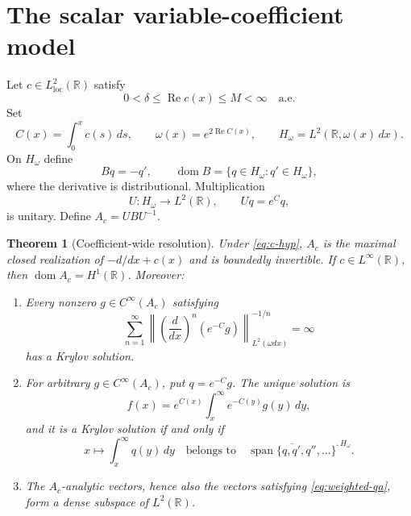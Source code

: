 \documentclass[11pt]{article}
\newtheorem{theorem}{Theorem}
\newcommand{\R}{\mathbb{R}}
\begin{document}
\section*{The scalar variable-coefficient model}

Let $c\in L^2_{\mathrm{loc}}(\R)$ satisfy
\begin{equation}\label{eq:c-hyp}
 0<\delta\leq\operatorname{Re}c(x)\leq M<\infty\quad\text{a.e.}
\end{equation}
Set
\[
 C(x)=\int_0^x c(s)\,ds,\qquad
 \omega(x)=e^{2\operatorname{Re}C(x)},\qquad
 H_\omega=L^2(\R,\omega(x)\,dx).
\]
On $H_\omega$ define
\[
 Bq=-q',\qquad
 \operatorname{dom}B=\{q\in H_\omega:q'\in H_\omega\},
\]
where the derivative is distributional.  Multiplication
\[
 U:H_\omega\to L^2(\R),\qquad Uq=e^Cq,
\]
is unitary.  Define $A_c=UBU^{-1}$.

\begin{theorem}[Coefficient-wide resolution]\label{thm:coefficient}
Under \eqref{eq:c-hyp}, $A_c$ is the maximal closed realization of
$-d/dx+c(x)$ and is boundedly invertible.  If $c\in L^\infty(\R)$, then
$\operatorname{dom}A_c=H^1(\R)$.  Moreover:
\begin{enumerate}[label=\textup{(\roman*)}]
\item Every nonzero $g\in C^\infty(A_c)$ satisfying
\begin{equation}\label{eq:weighted-qa}
 \sum_{n=1}^\infty
 \left\|\left(\frac d{dx}\right)^n(e^{-C}g)
 \right\|_{L^2(\omega dx)}^{-1/n}=\infty
\end{equation}
has a Krylov solution.
\item For arbitrary $g\in C^\infty(A_c)$, put $q=e^{-C}g$.  The unique
solution is
\begin{equation}\label{eq:solution-formula}
 f(x)=e^{C(x)}\int_x^\infty e^{-C(y)}g(y)\,dy,
\end{equation}
and it is a Krylov solution if and only if
\begin{equation}\label{eq:exact-weighted-criterion}
 x\longmapsto\int_x^\infty q(y)\,dy
 \quad\text{belongs to}\quad
 \overline{\operatorname{span}\{q,q',q'',\ldots\}}^{,H_\omega}.
\end{equation}
\item The $A_c$-analytic vectors, hence also the vectors satisfying
\eqref{eq:weighted-qa}, form a dense subspace of $L^2(\R)$.
\end{enumerate}
\end{theorem}
\end{document}
